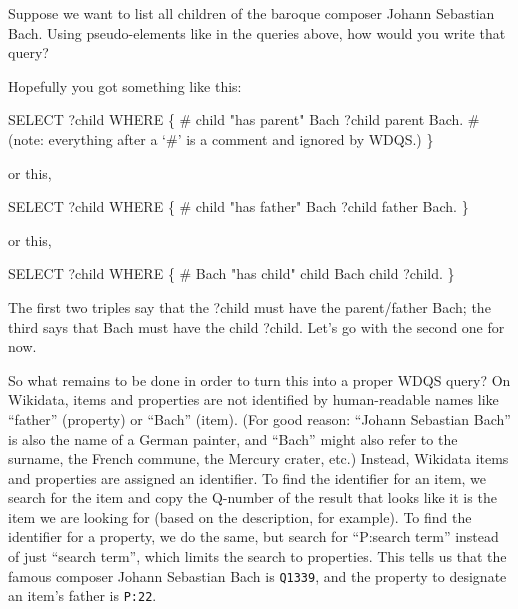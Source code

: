 \documentclass[
  letterpaper,
  DIV=11,
  numbers=noendperiod]{scrreprt}
\newenvironment{Shaded}{\begin{snugshade}}{\end{snugshade}}
\newcommand{\CommentTok}[1]{\textcolor[rgb]{0.37,0.37,0.37}{#1}}
\newcommand{\NormalTok}[1]{\textcolor[rgb]{0.00,0.23,0.31}{#1}}
\begin{document}
Suppose we want to list all children of the baroque composer Johann
Sebastian Bach. Using pseudo-elements like in the queries above, how
would you write that query?

Hopefully you got something like this:

\begin{Shaded}
\begin{Highlighting}[]
\NormalTok{SELECT ?child}
\NormalTok{WHERE}
\NormalTok{\{}
  \CommentTok{\#  child "has parent" Bach}
\NormalTok{  ?child parent Bach.}
  \CommentTok{\# (note: everything after a ‘\#’ is a comment and ignored by WDQS.)}
\NormalTok{\}}
\end{Highlighting}
\end{Shaded}

or this,

\begin{Shaded}
\begin{Highlighting}[]
\NormalTok{SELECT ?child}
\NormalTok{WHERE}
\NormalTok{\{}
  \CommentTok{\# child "has father" Bach }
\NormalTok{  ?child father Bach. }
\NormalTok{\}}
\end{Highlighting}
\end{Shaded}

or this,

\begin{Shaded}
\begin{Highlighting}[]
\NormalTok{SELECT ?child}
\NormalTok{WHERE}
\NormalTok{\{}
  \CommentTok{\#  Bach "has child" child}
\NormalTok{  Bach child ?child.}
\NormalTok{\}}
\end{Highlighting}
\end{Shaded}

The first two triples say that the ?child must have the parent/father
Bach; the third says that Bach must have the child ?child. Let's go with
the second one for now.

So what remains to be done in order to turn this into a proper WDQS
query? On Wikidata, items and properties are not identified by
human-readable names like ``father'' (property) or ``Bach'' (item). (For
good reason: ``Johann Sebastian Bach'' is also the name of a German
painter, and ``Bach'' might also refer to the surname, the French
commune, the Mercury crater, etc.) Instead, Wikidata items and
properties are assigned an identifier. To find the identifier for an
item, we search for the item and copy the Q-number of the result that
looks like it is the item we are looking for (based on the description,
for example). To find the identifier for a property, we do the same, but
search for ``P:search term'' instead of just ``search term'', which
limits the search to properties. This tells us that the famous composer
Johann Sebastian Bach is \texttt{Q1339}, and the property to designate
an item's father is \texttt{P:22}.
\end{document}
